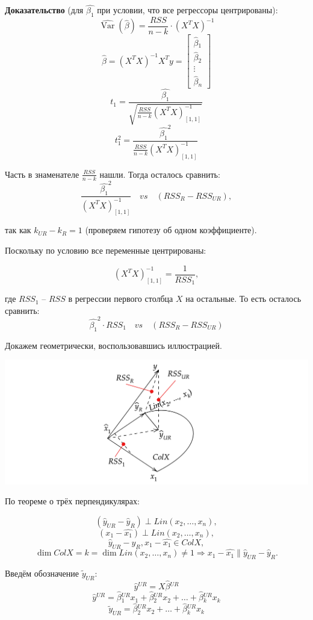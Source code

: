 \documentclass[12pt]{article} %
\theoremstyle{definition} %
\DeclareMathOperator{\Var}{Var}
\def \hb{\hat{\beta}}
\def \hy{\hat{y}}
\begin{document}
\textbf{Доказательство} (для $\hat{\beta_1}$ при условии, что все регрессоры центрированы):
\[ \hat{\Var}(\hb{}) = \frac{RSS}{n - k} \cdot (X^{T} X)^{-1}
\]
\[ \hat{\beta} = (X^{T} X)^{-1} X^{T}y = \begin{bmatrix}
           \hb{}_{1} \\
           \hb{}_{2} \\
           \vdots \\
           \hb{}_{n}
         \end{bmatrix}
\]
\[ t_1 = \frac{\hat{\beta_1}}{\sqrt{\frac{RSS}{n - k} (X^T X)^{-1}_{[1, 1]}}}
\]
\[ t^2_1 = \frac{\hat{\beta_1}^2}{\frac{RSS}{n - k} (X^T X)^{-1}_{[1, 1]}}
\]

Часть в знаменателе $\displaystyle \frac{RSS}{n - k}$ нашли. Тогда осталось сравнить:
\[
\frac{\hat{\beta_1}^2}{(X^T X)^{-1}_{[1, 1]}} \quad vs \quad (RSS_{R} - RSS_{UR}),
\]

так как $k_{UR} - k_{R} = 1$ (проверяем гипотезу об одном коэффициенте).

Поскольку по условию все переменные центрированы:

\[ (X^T X)^{-1}_{[1, 1]} = \frac{1}{RSS_{1}},\]

где $RSS_1$ -- $RSS$ в регрессии первого столбца $X$ на остальные.
То есть осталось сравнить:
\[
\hat{\beta_1}^2 \cdot RSS_1 \quad vs \quad (RSS_{R} - RSS_{UR})
\]

Докажем геометрически, воспользовавшись иллюстрацией.

\includegraphics[width=0.8\linewidth]{images/10_picture1.png}

По теореме о трёх перпендикулярах:

\[ (\hat{y}_{UR} - \hat{y}_{R}) \perp Lin(x_2, \ldots, x_n),
\]
\[
(x_1 -\hat{x_1}) \perp Lin(x_2, \ldots, x_n),
\]
\[\hat{y}_{UR} - \hat{y}_{R}, x_1 - \hat{x_1} \in Col X,\]
\[\dim Col X = k = \dim Lin(x_2, \ldots, x_n) \neq 1 \Rightarrow x_1 - \hat{x_1} \parallel \hat{y}_{UR} - \hat{y}_{R}.\]

Введём обозначение $\tilde{y}_{UR}$:
\[ \hy{}^{UR} = X \hb{}^{UR}
\]
\[ \hy{}^{UR} = \hb{}_1^{UR} x_1 + \hb{}_2^{UR} x_2 + \dots + \hb{}_k^{UR} x_k
\]
\[ \tilde{y}_{UR} = \hb{}_2^{UR} x_2 + \dots + \hb{}_k^{UR} x_k
\]
\end{document}
